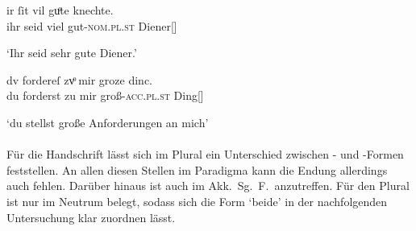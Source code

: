\begin{exe}
\ex \label{ex:kcpregel}
	\begin{xlist}
	\ex \label{ex:kcpregel_1}
		\gll ir ſit vil guͦte knechte. \\
			ihr seid viel gut-\textsc{nom.pl.st} Diener[\MascM] \\
		\begin{taggedline}{\parencites%
			[\pno~45\ra, 26]{kc:P}[vgl.]%
			[\pno~16\rb, 18]{kc:B1}%
			[\pno~26\vb, 35]{kc:VB}%
		}
		\trans `Ihr seid sehr gute Diener.'
		\end{taggedline}

	\ex \label{ex:kcpregel_2}
		\gll dv fordereſ zvͦ mir groze dinc. \\
			du forderst zu mir groß-\textsc{acc.pl.st} Ding[\NeutI] \\
		\begin{taggedline}{\parencites%
			[\pno~19\ra, 10]{kc:P}[vgl.]%
			[1991]{schroeder1895}
		}
		\trans `du stellst große Anforderungen an mich'
		\end{taggedline}
	\end{xlist}
\end{exe}

\paragraph{\citet{kc:C1}}
Für die Handschrift \citet{kc:C1} lässt sich im Plural ein Unterschied zwischen
- und -Formen feststellen. An allen diesen Stellen im
Paradigma kann die Endung allerdings auch fehlen. Darüber hinaus ist
 auch im Akk.\ Sg.\ F.\ anzutreffen. Für den Plural ist 
nur im Neutrum belegt, sodass sich die Form  `beide' in der
nachfolgenden Untersuchung klar zuordnen lässt.

